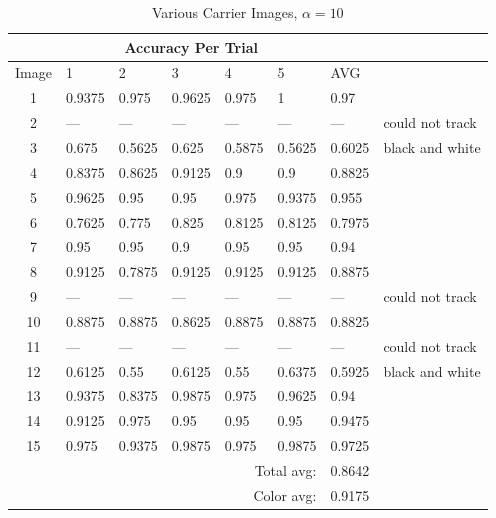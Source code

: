 \documentclass[11pt, letterpaper]{article}
\begin{document}
\begin{table}[t]
\label{tab:images}
\caption{Various Carrier Images, $\alpha=10$}
\centering
\begin{tabular}{c | l l l l l l l}
\\
&\multicolumn{5}{c}{Accuracy Per Trial}&\\ 
\toprule
Image&1&2&3&4&5&AVG\\ 
\midrule
1&0.9375&0.975&0.9625&0.975&1&0.97\\ 
2&---&---&---&---&---&---&could not track\\ 
3&0.675&0.5625&0.625&0.5875&0.5625&0.6025&black and white\\ 
4&0.8375&0.8625&0.9125&0.9&0.9&0.8825\\ 
5&0.9625&0.95&0.95&0.975&0.9375&0.955\\ 
6&0.7625&0.775&0.825&0.8125&0.8125&0.7975\\ 
7&0.95&0.95&0.9&0.95&0.95&0.94\\ 
8&0.9125&0.7875&0.9125&0.9125&0.9125&0.8875\\ 
9&---&---&---&---&---&---&could not track\\ 
10&0.8875&0.8875&0.8625&0.8875&0.8875&0.8825\\ 
11&---&---&---&---&---&---&could not track\\ 
12&0.6125&0.55&0.6125&0.55&0.6375&0.5925&black and white\\ 
13&0.9375&0.8375&0.9875&0.975&0.9625&0.94\\ 
14&0.9125&0.975&0.95&0.95&0.95&0.9475\\ 
15&0.975&0.9375&0.9875&0.975&0.9875&0.9725\\ 
\bottomrule
&&&&\multicolumn{2}{r}{Total avg:}&0.8642\\
&&&&\multicolumn{2}{r}{Color avg:}&0.9175\\ 
\end{tabular} 
\end{table}
\end{document}
